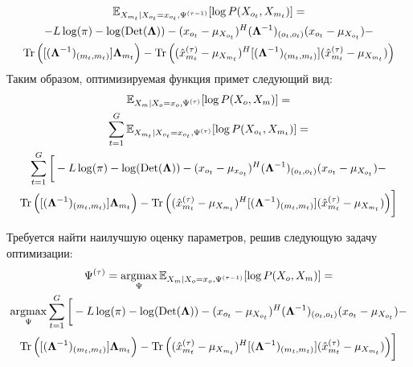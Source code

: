\documentclass[11pt]{article}
\newcommand{\Expect}{\mathbb{E}}
\DeclareMathOperator*{\argmax}{argmax}
\DeclareMathOperator{\Det}{Det}
\begin{document}
\begin{equation*}
\begin{gathered}
\Expect_{X_{m_t}|X_{o_t}=x_{o_t}, \Psi^{(\tau-1)}}[\log P(X_{o_t}, X_{m_t})]=\\
-L \log(\pi) - \log (\Det(\mathbf{\Lambda})) - (x_{o_t}-\mu_{X_{o_t}})^H (\mathbf{\Lambda}^{-1})_{(o_t, o_t)}(x_{o_t}-\mu_{X_{o_t}}) -  \\ \Tr \Big( [(\mathbf{\Lambda}^{-1})_{(m_t, m_t)}]\mathbf{\Lambda}_{m_t} \Big) - \Tr \Big((\hat{x}_{m_t}^{(\tau)} - \mu_{X_{m_t}})^H[(\mathbf{\Lambda}^{-1})_{(m_t, m_t)}](\hat{x}_{m_t}^{(\tau)} - \mu_{X_{m_t}}) \Big) 
\end{gathered}
\end{equation*}
Таким образом, оптимизируемая функция примет следующий вид:
\begin{equation*}
\begin{gathered}
 \Expect_{X_m|X_o=x_o, \Psi^{(\tau)}}[\log P(X_o, X_m)] = \\
 \sum_{t=1}^G\Expect_{X_{m_t}|X_{o_t}=x_{o_t}, \Psi^{(\tau)}}[\log P(X_{o_t}, X_{m_t})] = \\
\sum_{t=1}^G \bigg[ -L \log(\pi) - \log (\Det(\mathbf{\Lambda})) - (x_{o_t}-\mu_{x_{o_t}}) ^H (\mathbf{\Lambda}^{-1})_{(o_t, o_t)}(x_{o_t}-\mu_{X_{o_t}})  -  \\ \Tr \Big( [(\mathbf{\Lambda}^{-1})_{(m_t, m_t)}]\mathbf{\Lambda}_{m_t} \Big) - \Tr \Big((\hat{x}_{m_t}^{(\tau)} - \mu_{X_{m_t}})^H[(\mathbf{\Lambda}^{-1})_{(m_t, m_t)}](\hat{x}_{m_t}^{(\tau)} - \mu_{X_{m_t}}) \Big)  \bigg]
\end{gathered}
\end{equation*}
\begin{center}
\fontsize{14}{18}\selectfont {}
\end{center}
Требуется найти наилучшую оценку параметров, решив следующую задачу оптимизации:
\begin{equation*}
\begin{gathered}
\Psi^{(\tau)}=\argmax_{\Psi} \Expect_{X_m|X_o=x_o, \Psi^{(\tau-1)}}[\log P(X_o, X_m)] =\\
\argmax_{\Psi}  \sum_{t=1}^G \bigg[ -L \log(\pi) - \log (\Det(\mathbf{\Lambda})) - (x_{o_t}-\mu_{X_{o_t}})^H (\mathbf{\Lambda}^{-1})_{(o_t, o_t)}(x_{o_t}-\mu_{X_{o_t}}) -  \\ \Tr \Big( [(\mathbf{\Lambda}^{-1})_{(m_t, m_t)}]\mathbf{\Lambda}_{m_t} \Big) - \Tr \Big((\hat{x}_{m_t}^{(\tau)} - \mu_{X_{m_t}})^H[(\mathbf{\Lambda}^{-1})_{(m_t, m_t)}](\hat{x}_{m_t}^{(\tau)} - \mu_{X_{m_t}}) \Big)  \bigg]
\end{gathered}
\end{equation*}
\end{document}
